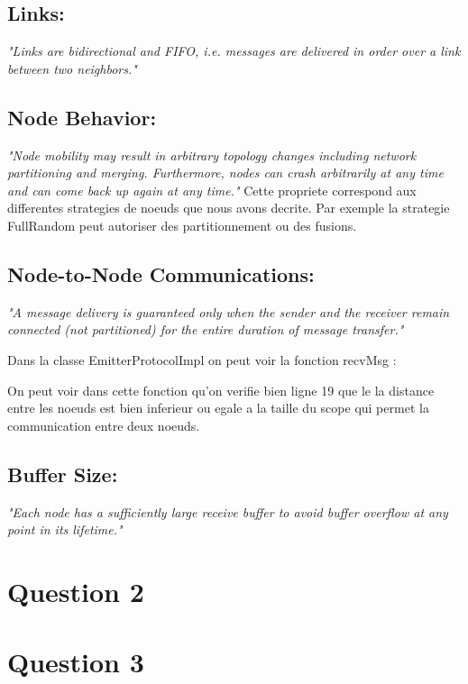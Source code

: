 \documentclass[11pt,a4paper,sans]{report}
\begin{document}
	\subsection{Links:}
	\textit{"Links are bidirectional and FIFO, i.e. messages are delivered in order over a link between two neighbors."}

	\subsection{Node Behavior:}
	\textit{"Node mobility may result in arbitrary topology changes including network partitioning and merging. Furthermore, nodes can crash arbitrarily at any time and can come back up again at any time."}
	Cette propriete correspond aux differentes strategies de noeuds que nous avons decrite. Par exemple la strategie FullRandom peut autoriser des partitionnement ou des fusions.

	\subsection{Node-to-Node Communications:}
	\textit{"A message delivery is guaranteed only when the sender and the receiver remain connected (not partitioned) for the entire duration of message transfer."}

	Dans la classe EmitterProtocolImpl on peut voir la fonction recvMsg :

	On peut voir dans cette fonction qu'on verifie bien ligne 19 que le la distance entre les noeuds est bien inferieur ou egale a la taille du scope qui permet la communication entre deux noeuds.

	\subsection{Buffer Size:}
	\textit{"Each node has a sufficiently large receive buffer to avoid buffer overflow at any point in its lifetime."}

	\section{Question 2}

	\section{Question 3}
\end{document}
